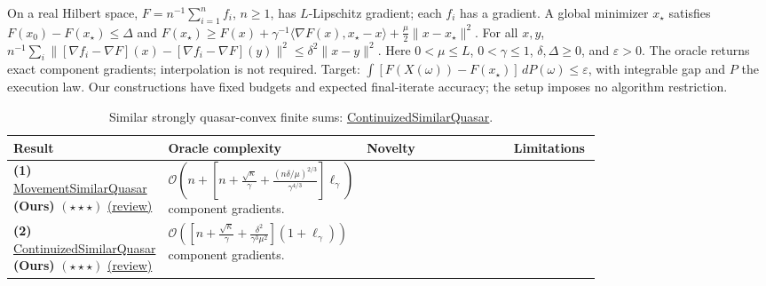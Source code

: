 \begin{table}[tp]
\centering
\caption{Similar strongly quasar-convex finite sums: \href{https://github.com/k3nfalt/longtails/blob/main/LongTails/Setups/ContinuizedSimilarQuasar.lean}{ContinuizedSimilarQuasar}.}\label{tab:ContinuizedSimilarQuasar}
\parbox{\linewidth}{\footnotesize On a real Hilbert space, $F=n^{-1}\sum_{i=1}^n f_i$, $n\ge1$, has $L$-Lipschitz gradient; each $f_i$ has a gradient. A global minimizer $x_\star$ satisfies $F(x_0)-F(x_\star)\le\Delta$ and $F(x_\star)\ge F(x)+\gamma^{-1}\langle\nabla F(x),x_\star-x\rangle+\frac\mu2\|x-x_\star\|^2$. For all $x,y$, $n^{-1}\sum_i\|[\nabla f_i-\nabla F](x)-[\nabla f_i-\nabla F](y)\|^2\le\delta^2\|x-y\|^2$. Here $0<\mu\le L$, $0<\gamma\le1$, $\delta,\Delta\ge0$, and $\varepsilon>0$. The oracle returns exact component gradients; interpolation is not required. Target: $\int [F(X(\omega))-F(x_\star)]\,dP(\omega)\le\varepsilon$, with integrable gap and $P$ the execution law. Our constructions have fixed budgets and expected final-iterate accuracy; the setup imposes no algorithm restriction.}\par\smallskip
\begin{threeparttable}
\footnotesize
\setlength{\tabcolsep}{4pt}\renewcommand{\arraystretch}{1.25}
\begin{tabularx}{\linewidth}{@{}>{\raggedright\arraybackslash}p{0.20\linewidth}>{\raggedright\arraybackslash}p{0.32\linewidth}>{\raggedright\arraybackslash}p{0.25\linewidth}>{\raggedright\arraybackslash}X@{}}
\toprule
\textbf{Result} & \textbf{Oracle complexity} & \textbf{Novelty} & \textbf{Limitations} \\
\midrule
\textbf{(1)} \href{https://github.com/k3nfalt/longtails/blob/main/LongTails/Theorems/MovementSimilarQuasar.lean}{Movement\allowbreak Similar\allowbreak Quasar} \textbf{(Ours)} $(\star\star\star)$ \href{https://github.com/k3nfalt/longtails/blob/main/scripts/reviews/MovementSimilarQuasar.md}{(review)}
& $\mathcal{O}\!\left(n+\left[n+\frac{\sqrt\kappa}{\gamma}+\frac{(n\delta/\mu)^{2/3}}{\gamma^{4/3}}\right]\ell_\gamma\right)$ component gradients.
& & \\
\midrule
\textbf{(2)} \href{https://github.com/k3nfalt/longtails/blob/main/LongTails/Theorems/ContinuizedSimilarQuasar.lean}{Continuized\allowbreak Similar\allowbreak Quasar} \textbf{(Ours)} $(\star\star\star)$ \href{https://github.com/k3nfalt/longtails/blob/main/scripts/reviews/ContinuizedSimilarQuasar.md}{(review)}
& $\mathcal{O}\!\left(\left[n+\frac{\sqrt\kappa}{\gamma}+\frac{\delta^2}{\gamma^3\mu^2}\right](1+\ell_\gamma)\right)$ component gradients.

\end{tabularx}
\end{threeparttable}
\end{table}
